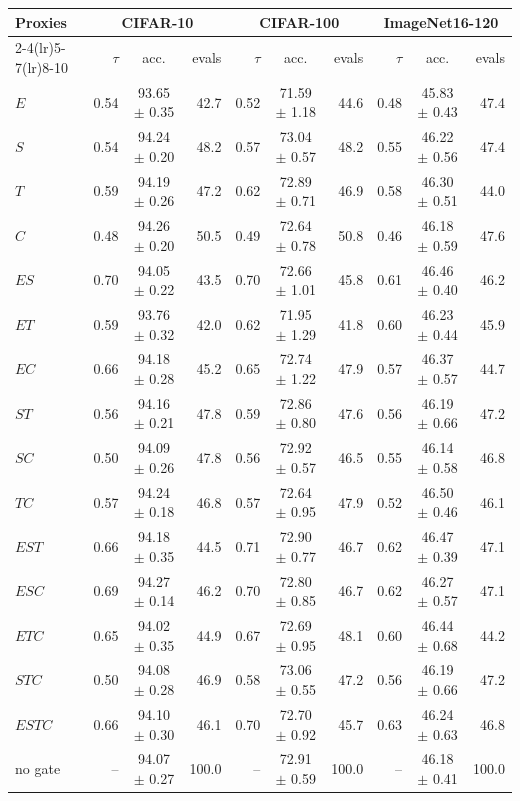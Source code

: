 \begin{tabular}{@{}lrcrrcrrcr@{}}
\toprule
\multirow{2}{*}{Proxies} & \multicolumn{3}{c}{CIFAR-10} & \multicolumn{3}{c}{CIFAR-100} & \multicolumn{3}{c}{ImageNet16-120}\\
\cmidrule(lr){2-4}\cmidrule(lr){5-7}\cmidrule(lr){8-10}
 & $\tau$ & acc. & evals & $\tau$ & acc. & evals & $\tau$ & acc. & evals\\
\midrule
$E$ & 0.54 & 93.65 $\pm$ 0.35 & 42.7 & 0.52 & 71.59 $\pm$ 1.18 & 44.6 & 0.48 & 45.83 $\pm$ 0.43 & 47.4\\
$S$ & 0.54 & 94.24 $\pm$ 0.20 & 48.2 & 0.57 & 73.04 $\pm$ 0.57 & 48.2 & 0.55 & 46.22 $\pm$ 0.56 & 47.4\\
$T$ & 0.59 & 94.19 $\pm$ 0.26 & 47.2 & 0.62 & 72.89 $\pm$ 0.71 & 46.9 & 0.58 & 46.30 $\pm$ 0.51 & 44.0\\
$C$ & 0.48 & 94.26 $\pm$ 0.20 & 50.5 & 0.49 & 72.64 $\pm$ 0.78 & 50.8 & 0.46 & 46.18 $\pm$ 0.59 & 47.6\\
$ES$ & 0.70 & 94.05 $\pm$ 0.22 & 43.5 & 0.70 & 72.66 $\pm$ 1.01 & 45.8 & 0.61 & 46.46 $\pm$ 0.40 & 46.2\\
$ET$ & 0.59 & 93.76 $\pm$ 0.32 & 42.0 & 0.62 & 71.95 $\pm$ 1.29 & 41.8 & 0.60 & 46.23 $\pm$ 0.44 & 45.9\\
$EC$ & 0.66 & 94.18 $\pm$ 0.28 & 45.2 & 0.65 & 72.74 $\pm$ 1.22 & 47.9 & 0.57 & 46.37 $\pm$ 0.57 & 44.7\\
$ST$ & 0.56 & 94.16 $\pm$ 0.21 & 47.8 & 0.59 & 72.86 $\pm$ 0.80 & 47.6 & 0.56 & 46.19 $\pm$ 0.66 & 47.2\\
$SC$ & 0.50 & 94.09 $\pm$ 0.26 & 47.8 & 0.56 & 72.92 $\pm$ 0.57 & 46.5 & 0.55 & 46.14 $\pm$ 0.58 & 46.8\\
$TC$ & 0.57 & 94.24 $\pm$ 0.18 & 46.8 & 0.57 & 72.64 $\pm$ 0.95 & 47.9 & 0.52 & 46.50 $\pm$ 0.46 & 46.1\\
$EST$ & 0.66 & 94.18 $\pm$ 0.35 & 44.5 & 0.71 & 72.90 $\pm$ 0.77 & 46.7 & 0.62 & 46.47 $\pm$ 0.39 & 47.1\\
$ESC$ & 0.69 & 94.27 $\pm$ 0.14 & 46.2 & 0.70 & 72.80 $\pm$ 0.85 & 46.7 & 0.62 & 46.27 $\pm$ 0.57 & 47.1\\
$ETC$ & 0.65 & 94.02 $\pm$ 0.35 & 44.9 & 0.67 & 72.69 $\pm$ 0.95 & 48.1 & 0.60 & 46.44 $\pm$ 0.68 & 44.2\\
$STC$ & 0.50 & 94.08 $\pm$ 0.28 & 46.9 & 0.58 & 73.06 $\pm$ 0.55 & 47.2 & 0.56 & 46.19 $\pm$ 0.66 & 47.2\\
$ESTC$ & 0.66 & 94.10 $\pm$ 0.30 & 46.1 & 0.70 & 72.70 $\pm$ 0.92 & 45.7 & 0.63 & 46.24 $\pm$ 0.63 & 46.8\\
no gate & -- & 94.07 $\pm$ 0.27 & 100.0 & -- & 72.91 $\pm$ 0.59 & 100.0 & -- & 46.18 $\pm$ 0.41 & 100.0\\
\bottomrule
\end{tabular}
